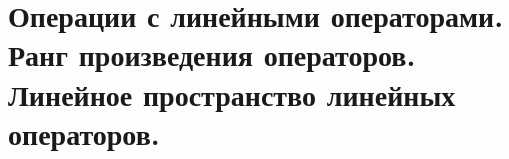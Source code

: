 \section{
    Операции с линейными операторами. Ранг произведения операторов. Линейное пространство линейных операторов.
}
